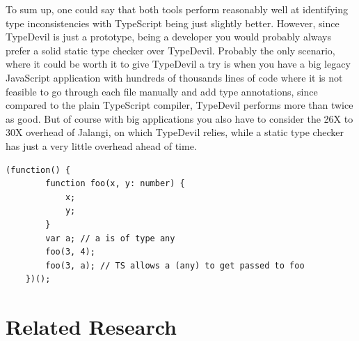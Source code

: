\documentclass[runningheads,a4paper]{llncs}
\begin{document}
To sum up, one could say that both tools perform reasonably well at identifying type inconsistencies with TypeScript being just slightly better.
However, since TypeDevil is just a prototype, being a developer you would probably always prefer a solid static type checker over TypeDevil.
Probably the only scenario, where it could be worth it to give TypeDevil a try is when you have a big legacy JavaScript application with hundreds of thousands lines of code where it is not feasible to go through each file manually and add type annotations, since compared to the plain TypeScript compiler, TypeDevil performs more than twice as good.
But of course with big applications you also have to consider the 26X to 30X overhead of Jalangi, on which TypeDevil relies, while a static type checker has just a very little overhead ahead of time.

\medskip\medskip
\lstset{language=javascript}
\begin{minipage}{\linewidth}
\begin{lstlisting}[frame=single, caption=Inconsistent Function Args , label={lst:InconsistentFunctionArgs}]
    (function() {
        function foo(x, y: number) {
            x;
            y;
        } 
        var a; // a is of type any
        foo(3, 4);
        foo(3, a); // TS allows a (any) to get passed to foo
    })();
\end{lstlisting}
\end{minipage}

\newpage

\section{Related Research}
\end{document}
